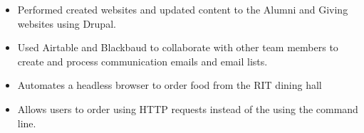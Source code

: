 \documentclass[10pt,a4paper,ragged2e,withhyper]{altacv}
\begin{document}
\begin{paracol}{2}
    \divider
    

\begin{itemize}
\item Performed created websites and updated content to the Alumni and Giving websites using Drupal. 
\item Used Airtable and Blackbaud to collaborate with other team members to create and process communication emails and email lists. 
    \end{itemize}
    
\smallskip \smallskip
    \newline
       			 
  


    
    
    \switchcolumn
    
                   
    

    \smallskip
    
     
    \newline
      
    
    \smallskip
    
          \newline {}
      
    \bigskip
    \smallskip
    
    
      
    
    \switchcolumn


    
    \begin{itemize}
    \item Automates a headless browser to order food from the RIT dining hall
    \item Allows users to order using HTTP requests instead of the using the command line.


\end{itemize}
\end{paracol}
\end{document}
